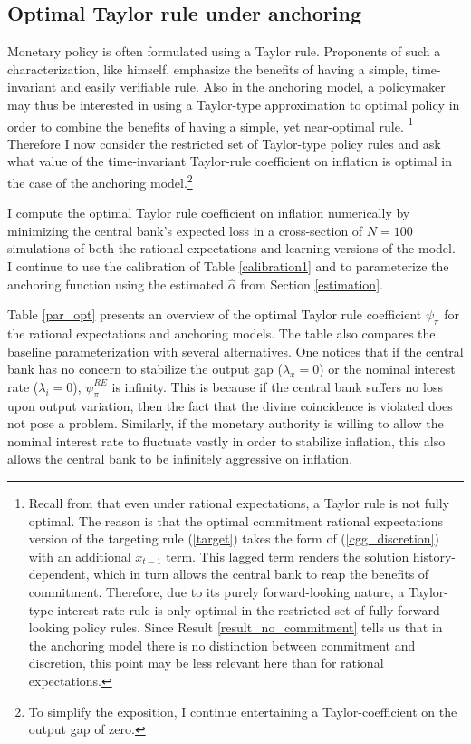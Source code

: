 \documentclass[11pt]{article}
\renewcommand{\[}{\begin{equation}}
\renewcommand{\]}{\end{equation}}
\begin{document}

  
\subsection{Optimal Taylor rule under anchoring}\label{opt_TR}
Monetary policy is often formulated using a Taylor rule. Proponents of such a characterization, like \cite{taylor1993discretion} himself, emphasize the benefits of having a simple, time-invariant and easily verifiable rule. Also in the anchoring model, a policymaker may thus be interested in using a Taylor-type approximation to optimal policy in order to combine the benefits of having a simple, yet near-optimal rule. \footnote{Recall from \cite{woodford2011interest} that even under rational expectations, a Taylor rule is not fully optimal. The reason is that the optimal commitment rational expectations version of the targeting rule (\ref{target}) takes the form of (\ref{cgg_discretion}) with an additional $x_{t-1}$ term. This lagged term renders the solution history-dependent, which in turn allows the central bank to reap the benefits of commitment. Therefore, due to its purely forward-looking nature, a Taylor-type interest rate rule is only optimal in the restricted set of fully forward-looking policy rules. Since Result \ref{result_no_commitment} tells us that in the anchoring model there is no distinction between commitment and discretion, this point may be less relevant here than for rational expectations.} Therefore I now consider the restricted set of Taylor-type policy rules and ask what value of the time-invariant Taylor-rule coefficient on inflation is optimal in the case of the anchoring model.\footnote{To simplify the exposition, I continue entertaining a Taylor-coefficient on the output gap of zero.}

I compute the optimal Taylor rule coefficient on inflation numerically by minimizing the central bank's expected loss in a cross-section of $N=100$ simulations of both the rational expectations and learning versions of the model. I continue to use the calibration of Table \ref{calibration1} and to parameterize the anchoring function using the estimated $\hat{\alpha}$ from Section \ref{estimation}.

Table \ref{par_opt} presents an overview of the optimal Taylor rule coefficient $\psi_{\pi}$ for the rational expectations and anchoring models. The table also compares the baseline parameterization with several alternatives. One notices that if the central bank has no concern to stabilize the output gap ($\lambda_x = 0$) or the nominal interest rate ($\lambda_i =0$), $\psi_{\pi}^{RE}$ is infinity. This is because if the central bank suffers no loss upon output variation, then the fact that the divine coincidence is violated does not pose a problem. Similarly, if the monetary authority is willing to allow the nominal interest rate to fluctuate vastly in order to stabilize inflation, this also allows the central bank to be infinitely aggressive on inflation. 
\end{document}
